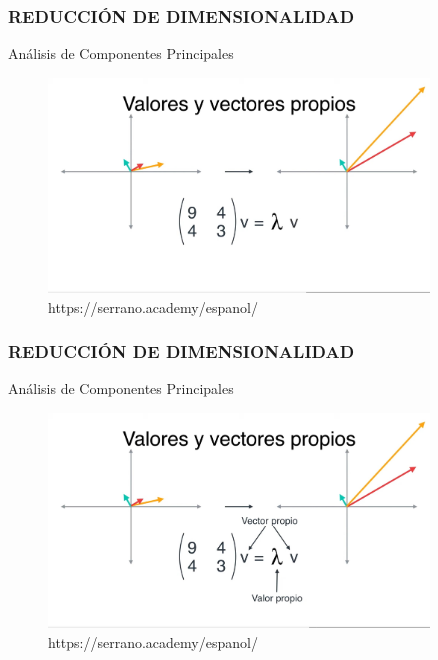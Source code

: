 \documentclass{beamer}
\begin{document}
\begin{frame}
	\frametitle{REDUCCIÓN DE DIMENSIONALIDAD}
	\begin{block}{Análisis de Componentes Principales}	
		\begin{figure}
			\includegraphics[width=0.9\textwidth]{PCA/IMG_3579.jpg}
			\caption{https://serrano.academy/espanol/}
		\end{figure}
	\end{block}
\end{frame}

\begin{frame}
	\frametitle{REDUCCIÓN DE DIMENSIONALIDAD}
	\begin{block}{Análisis de Componentes Principales}	
		\begin{figure}
			\includegraphics[width=0.9\textwidth]{PCA/IMG_3580.jpg}
			\caption{https://serrano.academy/espanol/}
		\end{figure}
	\end{block}
\end{frame}
\end{document}
